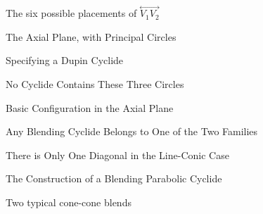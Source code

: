 \begin{figure}
\vspace{3cm}
\caption{The six possible placements of $\stackrel{\longleftrightarrow}{V_1V_2}$}
\label{fig:configs}
\end{figure}

\begin{figure}
\vspace{6.5cm}
\caption{The Axial Plane, with Principal Circles}
\label{fig:Q-RS}
\end{figure}

\begin{figure}
\vspace{4.5cm}
\caption{Specifying a Dupin Cyclide}
\label{fig:specification-nondegen}
\end{figure}

\begin{figure}
\vspace{5.5cm}
\caption{No Cyclide Contains These Three Circles}
\label{fig:wrong-example}
\end{figure}

\begin{figure}
\vspace{6.5cm}
\caption{Basic Configuration in the Axial Plane}
\label{fig:int-config}
\end{figure}

\begin{figure}
\vspace{14cm}
\caption{Any Blending Cyclide Belongs to One of the Two Families}
\label{fig:concurrent}
\end{figure}

\begin{figure}
\vspace{7.5cm}
\caption{There is Only One Diagonal in the Line-Conic Case}
\label{fig:three-lines}
\end{figure}

\begin{figure}
\vspace{5.5cm}
\caption{The Construction of a Blending Parabolic Cyclide}
\label{fig:parabolic-construct}
\end{figure}


\begin{figure}
\vspace{3.5in}
\caption{Two typical cone-cone blends}
\label{fig:1}
\end{figure}

